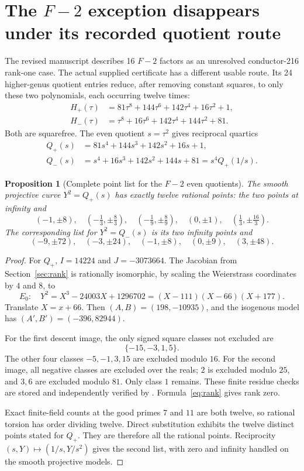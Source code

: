 \documentclass[11pt]{article}
\newtheorem{proposition}[theorem]{Proposition}
\theoremstyle{remark}\newtheorem{remark}[theorem]{Remark}
\begin{document}
\section{The $F{-}2$ exception disappears under its recorded quotient route}\label{sec:f2}
The revised manuscript describes 16 $F{-}2$ factors as an unresolved conductor-216 rank-one case. The actual supplied certificate has a different usable route. Its 24 higher-genus quotient entries reduce, after removing constant squares, to only these two polynomials, each occurring twelve times:
\begin{align*}
H_+(\tau)&=81\tau^8+144\tau^6+142\tau^4+16\tau^2+1,\\
H_-(\tau)&=\tau^8+16\tau^6+142\tau^4+144\tau^2+81.
\end{align*}
Both are squarefree. The even quotient $s=\tau^2$ gives reciprocal quartics
\begin{align*}
Q_+(s)&=81s^4+144s^3+142s^2+16s+1,\\
Q_-(s)&=s^4+16s^3+142s^2+144s+81=s^4Q_+(1/s).
\end{align*}

\begin{proposition}[Complete point list for the $F{-}2$ even quotients]\label{prop:f2points}
The smooth projective curve $Y^2=Q_+(s)$ has exactly twelve rational points: the two points at infinity and
\[
(-1,\pm8),\quad
\left(-\tfrac13,\pm\tfrac83\right),\quad
\left(-\tfrac19,\pm\tfrac89\right),\quad
(0,\pm1),\quad
\left(\tfrac13,\pm\tfrac{16}3\right).
\]
The corresponding list for $Y^2=Q_-(s)$ is its two infinity points and
\[
(-9,\pm72),\quad(-3,\pm24),\quad(-1,\pm8),\quad
(0,\pm9),\quad(3,\pm48).
\]
\end{proposition}
\begin{proof}
For $Q_+$, $I=14224$ and $J=-3073664$. The Jacobian from Section~\ref{sec:rank} is rationally isomorphic, by scaling the Weierstrass coordinates by $4$ and $8$, to
\begin{equation}\label{eq:F2E}
E_0:\quad Y^2=X^3-24003X+1296702
=(X-111)(X-66)(X+177).
\end{equation}
Translate $X=x+66$. Then $(A,B)=(198,-10935)$, and the isogenous model has $(A',B')=(-396,82944)$.

For the first descent image, the only signed square classes not excluded are
\[
\{-15,-3,1,5\}.
\]
The other four classes $-5,-1,3,15$ are excluded modulo $16$. For the second image, all negative classes are excluded over the reals; $2$ is excluded modulo $25$, and $3,6$ are excluded modulo $81$. Only class $1$ remains. These finite residue checks are stored and independently verified by . Formula~\eqref{eq:rank} gives rank zero.

Exact finite-field counts at the good primes $7$ and $11$ are both twelve, so rational torsion has order dividing twelve. Direct substitution exhibits the twelve distinct points stated for $Q_+$. They are therefore all the rational points. Reciprocity $(s,Y)\mapsto(1/s,Y/s^2)$ gives the second list, with zero and infinity handled on the smooth projective models.
\end{proof}
\end{document}
